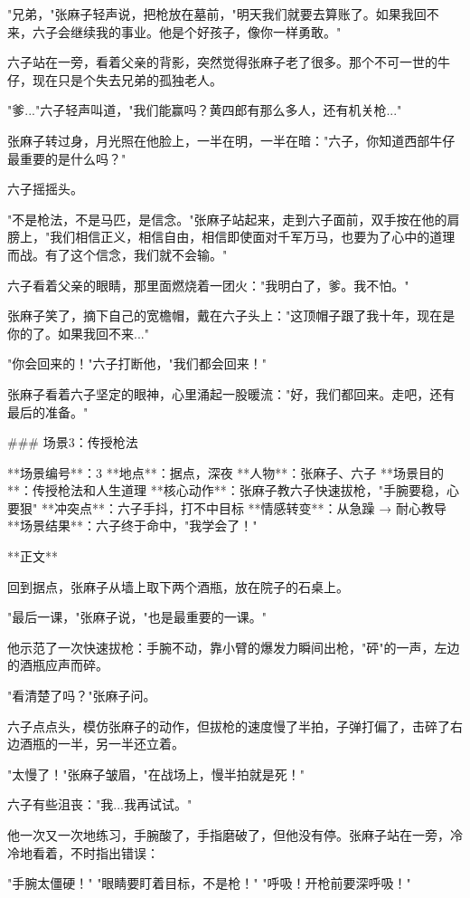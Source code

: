 "兄弟，"张麻子轻声说，把枪放在墓前，"明天我们就要去算账了。如果我回不来，六子会继续我的事业。他是个好孩子，像你一样勇敢。"

六子站在一旁，看着父亲的背影，突然觉得张麻子老了很多。那个不可一世的牛仔，现在只是个失去兄弟的孤独老人。

"爹..."六子轻声叫道，"我们能赢吗？黄四郎有那么多人，还有机关枪..."

张麻子转过身，月光照在他脸上，一半在明，一半在暗："六子，你知道西部牛仔最重要的是什么吗？"

六子摇摇头。

"不是枪法，不是马匹，是信念。"张麻子站起来，走到六子面前，双手按在他的肩膀上，"我们相信正义，相信自由，相信即使面对千军万马，也要为了心中的道理而战。有了这个信念，我们就不会输。"

六子看着父亲的眼睛，那里面燃烧着一团火："我明白了，爹。我不怕。"

张麻子笑了，摘下自己的宽檐帽，戴在六子头上："这顶帽子跟了我十年，现在是你的了。如果我回不来..."

"你会回来的！"六子打断他，"我们都会回来！"

张麻子看着六子坚定的眼神，心里涌起一股暖流："好，我们都回来。走吧，还有最后的准备。"

### 场景3：传授枪法

**场景编号**：3  
**地点**：据点，深夜  
**人物**：张麻子、六子  
**场景目的**：传授枪法和人生道理  
**核心动作**：张麻子教六子快速拔枪，"手腕要稳，心要狠"  
**冲突点**：六子手抖，打不中目标  
**情感转变**：从急躁 → 耐心教导  
**场景结果**：六子终于命中，"我学会了！"

**正文**

回到据点，张麻子从墙上取下两个酒瓶，放在院子的石桌上。

"最后一课，"张麻子说，"也是最重要的一课。"

他示范了一次快速拔枪：手腕不动，靠小臂的爆发力瞬间出枪，"砰"的一声，左边的酒瓶应声而碎。

"看清楚了吗？"张麻子问。

六子点点头，模仿张麻子的动作，但拔枪的速度慢了半拍，子弹打偏了，击碎了右边酒瓶的一半，另一半还立着。

"太慢了！"张麻子皱眉，"在战场上，慢半拍就是死！"

六子有些沮丧："我...我再试试。"

他一次又一次地练习，手腕酸了，手指磨破了，但他没有停。张麻子站在一旁，冷冷地看着，不时指出错误：

"手腕太僵硬！"
"眼睛要盯着目标，不是枪！"
"呼吸！开枪前要深呼吸！"

